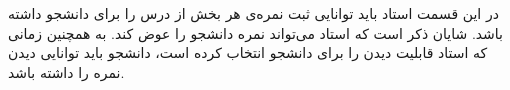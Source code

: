 در این قسمت استاد باید توانایی ثبت نمره‌ی هر بخش از درس را برای دانشجو داشته باشد.  
شایان ذکر است که استاد می‌تواند نمره دانشجو را عوض کند.  
به همچنین زمانی که استاد قابلیت دیدن را برای دانشجو انتخاب کرده است، دانشجو باید توانایی دیدن نمره را داشته باشد.